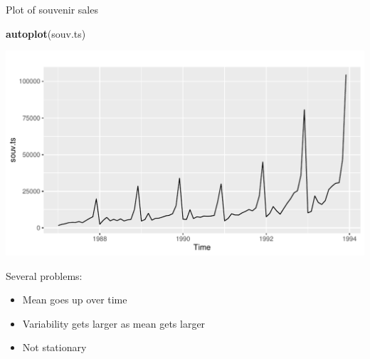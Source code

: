 \documentclass[ignorenonframetext,]{beamer}
\newenvironment{Shaded}{\begin{snugshade}}{\end{snugshade}}
\newcommand{\KeywordTok}[1]{\textcolor[rgb]{0.13,0.29,0.53}{\textbf{#1}}}
\newcommand{\NormalTok}[1]{#1}
\providecommand{\tightlist}{%
  \setlength{\itemsep}{0pt}\setlength{\parskip}{0pt}}
\begin{document}
\begin{frame}[fragile]{Plot of souvenir sales}
\protect\hypertarget{plot-of-souvenir-sales}{}

\begin{Shaded}
\begin{Highlighting}[]
\KeywordTok{autoplot}\NormalTok{(souv.ts)}
\end{Highlighting}
\end{Shaded}

\includegraphics{figure/unnamed-chunk-540-1.pdf}

\end{frame}

\begin{frame}{Several problems:}
\protect\hypertarget{several-problems}{}

\begin{itemize}
\tightlist
\item
  Mean goes up over time
\item
  Variability gets larger as mean gets larger
\item
  Not stationary
\end{itemize}

\end{frame}
\end{document}
